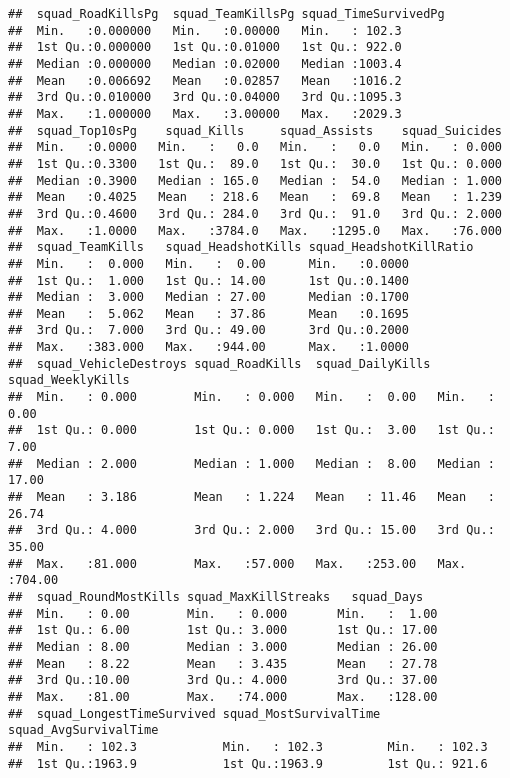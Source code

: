 \documentclass[]{article}
\begin{document}
\begin{verbatim}
##  squad_RoadKillsPg  squad_TeamKillsPg squad_TimeSurvivedPg
##  Min.   :0.000000   Min.   :0.00000   Min.   : 102.3      
##  1st Qu.:0.000000   1st Qu.:0.01000   1st Qu.: 922.0      
##  Median :0.000000   Median :0.02000   Median :1003.4      
##  Mean   :0.006692   Mean   :0.02857   Mean   :1016.2      
##  3rd Qu.:0.010000   3rd Qu.:0.04000   3rd Qu.:1095.3      
##  Max.   :1.000000   Max.   :3.00000   Max.   :2029.3      
##  squad_Top10sPg    squad_Kills     squad_Assists    squad_Suicides  
##  Min.   :0.0000   Min.   :   0.0   Min.   :   0.0   Min.   : 0.000  
##  1st Qu.:0.3300   1st Qu.:  89.0   1st Qu.:  30.0   1st Qu.: 0.000  
##  Median :0.3900   Median : 165.0   Median :  54.0   Median : 1.000  
##  Mean   :0.4025   Mean   : 218.6   Mean   :  69.8   Mean   : 1.239  
##  3rd Qu.:0.4600   3rd Qu.: 284.0   3rd Qu.:  91.0   3rd Qu.: 2.000  
##  Max.   :1.0000   Max.   :3784.0   Max.   :1295.0   Max.   :76.000  
##  squad_TeamKills   squad_HeadshotKills squad_HeadshotKillRatio
##  Min.   :  0.000   Min.   :  0.00      Min.   :0.0000         
##  1st Qu.:  1.000   1st Qu.: 14.00      1st Qu.:0.1400         
##  Median :  3.000   Median : 27.00      Median :0.1700         
##  Mean   :  5.062   Mean   : 37.86      Mean   :0.1695         
##  3rd Qu.:  7.000   3rd Qu.: 49.00      3rd Qu.:0.2000         
##  Max.   :383.000   Max.   :944.00      Max.   :1.0000         
##  squad_VehicleDestroys squad_RoadKills  squad_DailyKills squad_WeeklyKills
##  Min.   : 0.000        Min.   : 0.000   Min.   :  0.00   Min.   :  0.00   
##  1st Qu.: 0.000        1st Qu.: 0.000   1st Qu.:  3.00   1st Qu.:  7.00   
##  Median : 2.000        Median : 1.000   Median :  8.00   Median : 17.00   
##  Mean   : 3.186        Mean   : 1.224   Mean   : 11.46   Mean   : 26.74   
##  3rd Qu.: 4.000        3rd Qu.: 2.000   3rd Qu.: 15.00   3rd Qu.: 35.00   
##  Max.   :81.000        Max.   :57.000   Max.   :253.00   Max.   :704.00   
##  squad_RoundMostKills squad_MaxKillStreaks   squad_Days    
##  Min.   : 0.00        Min.   : 0.000       Min.   :  1.00  
##  1st Qu.: 6.00        1st Qu.: 3.000       1st Qu.: 17.00  
##  Median : 8.00        Median : 3.000       Median : 26.00  
##  Mean   : 8.22        Mean   : 3.435       Mean   : 27.78  
##  3rd Qu.:10.00        3rd Qu.: 4.000       3rd Qu.: 37.00  
##  Max.   :81.00        Max.   :74.000       Max.   :128.00  
##  squad_LongestTimeSurvived squad_MostSurvivalTime squad_AvgSurvivalTime
##  Min.   : 102.3            Min.   : 102.3         Min.   : 102.3       
##  1st Qu.:1963.9            1st Qu.:1963.9         1st Qu.: 921.6       

\end{verbatim}
\end{document}
